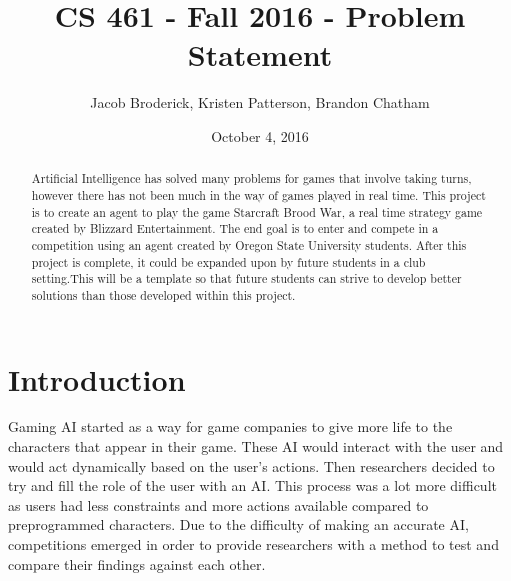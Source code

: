 \documentclass[10pt,letterpaper,onecolumn,draftclsnofoot]{IEEEtran}
\begin{document}
\begin{titlepage}
  \title{CS 461 - Fall 2016 - Problem Statement}
  \author{Jacob Broderick, Kristen Patterson, Brandon Chatham}
  \date{October 4, 2016}
  \maketitle
  \vspace{4cm}
  \begin{abstract}
  	\noindent 
  	  	\noindent 
  	Artificial Intelligence has solved many problems for games that involve taking turns, however there has not been much in the way of games played in real time. This project is to create an agent to play the game Starcraft Brood War, a real time strategy game created by Blizzard Entertainment. The end goal is to enter and compete in a competition using an agent created by Oregon State University students. After this project is complete, it could be expanded upon by future students in a club setting.This will be a template so that future students can strive to develop better solutions than those developed within this project.
  \end{abstract}
\end{titlepage}
\section{Introduction}
Gaming AI started as a way for game companies to give more life to the characters that appear in their game. These AI would interact with the user and would act dynamically based on the user's actions. Then researchers decided to try and fill the role of the user with an AI. This process was a lot more difficult as users had less constraints and more actions available compared to preprogrammed characters. Due to the difficulty of making an accurate AI, competitions emerged in order to provide researchers with a method to test and compare their findings against each other.
\end{document}
